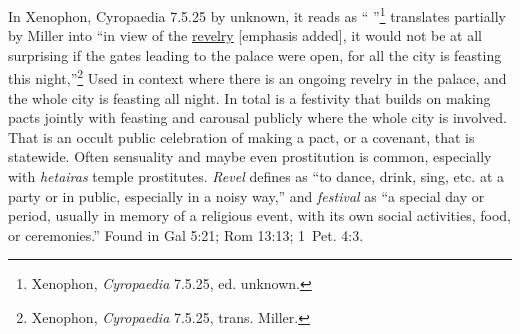 In Xenophon, Cyropaedia 7.5.25 by unknown, it reads as ``\underline{} ''\footnote{Xenophon, \emph{Cyropaedia} 7.5.25, ed. unknown.}
translates partially by Miller into ``in view of the \underline{revelry} [emphasis added], it would not be at all surprising if the gates leading to the palace were open, for all the city is feasting this night,''\footnote{Xenophon, \emph{Cyropaedia} 7.5.25, trans. Miller.}
Used in context where there is an ongoing revelry in the palace, and the whole city is feasting all night. 
In total  is a festivity that builds on making pacts jointly with feasting and carousal publicly where the whole city is involved. That is an occult public celebration of making a pact, or a covenant, that is statewide. Often sensuality and maybe even prostitution is common, especially with \emph{hetairas} temple prostitutes. \emph{Revel} defines as ``to dance, drink, sing, etc. at a party or in public, especially in a noisy way,'' and \emph{festival} as ``a special day or period, usually in memory of a religious event, with its own social activities, food, or ceremonies.''
Found in Gal 5:21; Rom 13:13; 1~Pet. 4:3.
